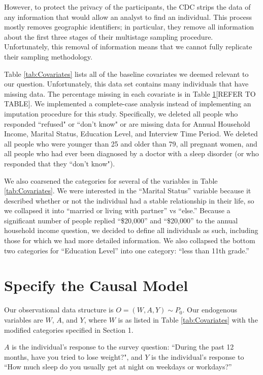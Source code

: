 \documentclass{article}
\begin{document}
However, to protect the privacy of the participants, the CDC strips the data of any information that would allow an analyst to find an individual.  This process mostly removes geographic identifiers; in particular, they remove all information about the first three stages of their multistage sampling procedure.  Unfortunately, this removal of information means that we cannot fully replicate their sampling methodology. 

Table \ref{tab:Covariates} lists all of the baseline covariates we deemed relevant to our question.  Unfortunately, this data set contains many individuals that have missing data.  The percentage missing in each covariate is in Table \ref{}[REFER TO TABLE].  We implemented a complete-case analysis instead of implementing an imputation procedure for this study. Specifically, we deleted all people who responded ``refused" or ``don't know" or are missing data for Annual Household Income, Marital Status, Education Level, and Interview Time Period.  We deleted all people who were younger than 25 and older than 79, all pregnant women, and all people who had ever been diagnosed by a doctor with a sleep disorder (or who responded that they ``don't know").  

We also coarsened the categories for several of the variables in Table \ref{tab:Covariates}.  We were interested in the ``Marital Status'' variable because it described whether or not the individual had a stable relationship in their life, so we collapsed it into ``married or living with partner'' vs ``else.''  Because a significant number of people replied ``\$20,000'' and ``\$20,000'' to the annual household income question, we decided to define all individuals as such, including those for which we had more detailed information.  We also collapsed the bottom two categories for ``Education Level'' into one category: ``less than 11th grade.''

\section{Specify the Causal Model}

Our observational data structure is $O=(W,A,Y) \sim P_0$. Our endogenous variables are $W$, $A$, and $Y$, where $W$ is as listed in Table \ref{tab:Covariates} with the modified categories specified in Section 1.

$A$ is the individual's response to the survey question: ``During the past 12 months, have you tried to lose weight?", and $Y$ is the individual's response to ``How much sleep do you usually get at night on weekdays or workdays?''  
\end{document}
